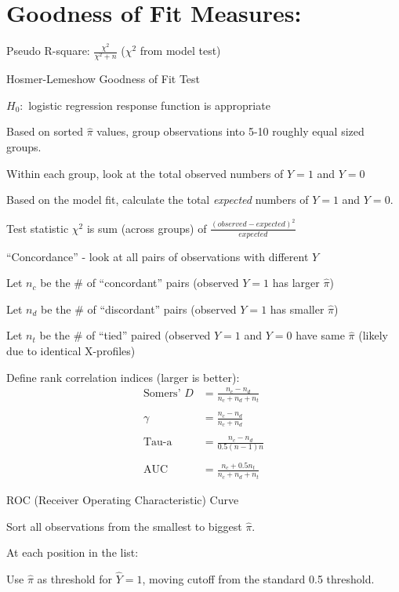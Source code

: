 \documentclass[12pt]{notes}
\begin{document}
\section{Goodness of Fit Measures:}
\bi
\item Pseudo R-square: $\frac{\chi^2}{\chi^2 +n}$ ($\chi^2$ from model test)
\item Hosmer-Lemeshow Goodness of Fit Test
\bi
\item $H_0:$ logistic regression response function is appropriate 
\item Based on sorted $\hat{\pi}$ values, group observations into 5-10 roughly equal sized groups. 
\item Within each group, look at the total observed numbers of $Y=1$ and $Y=0$
\item Based on the model fit, calculate the total \textit{expected} numbers of $Y=1$ and $Y=0$. 
\item Test statistic $\chi^2$ is sum (across groups) of $\frac{(observed - expected)^2}{expected}$
\ei
\item ``Concordance'' - look at all pairs of observations with different $Y$
\bi
\item Let $n_c$ be the \# of ``concordant'' pairs (observed $Y=1$ has larger $\hat{\pi}$)
\item Let $n_d$ be the \# of ``discordant'' pairs (observed $Y=1$ has smaller $\hat{\pi}$)
\item Let $n_t$ be the \# of ``tied'' paired (observed $Y=1$ and $Y=0$ have same $\hat{\pi}$ (likely due to identical X-profiles)
\item Define rank correlation indices (larger is better):
\begin{align*}
\text{Somers' }D &= \frac{n_c - n_d}{n_c+n_d+n_t} \\
\\
\gamma &= \frac{n_c-n_d}{n_c + n_d} \\
\\
\text{Tau-a} &= \frac{n_c - n_d}{0.5(n-1)n} \\
\\
\text{AUC} &=  \frac{n_c + 0.5n_t}{n_c+n_d+n_t} 
\end{align*}
\ei
\item ROC (Receiver Operating Characteristic) Curve
\bi
\item Sort all observations from the smallest to biggest $\hat{\pi}.$
\item At each position in the list:
\bi
\item Use $\hat{\pi}$ as threshold for $\hat{Y} = 1$, moving cutoff from the standard 0.5 threshold. 
\end{document}
